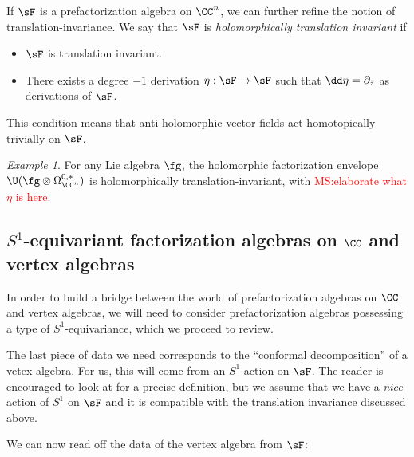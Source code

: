 \documentclass[12pt]{amsart}
\theoremstyle{definition}
\theoremstyle{remark}
\newtheorem{eg}[theorem]{Example}
\def\matt{\textcolor{red}{MS:}\textcolor{red}}
\begin{document}
If $\sF$ is a
prefactorization algebra on $\CC^n$, we can further refine the notion of translation-invariance. 
We say that $\sF$ is {\it holomorphically translation invariant}
if
\begin{itemize}
\item $\sF$ is translation invariant. 
\item There exists a degree $-1$ derivation $\eta: \sF \to
  \sF$ such that $\dd \eta = \partial_{\Bar{z}}$ as derivations of
  $\sF$. 
\end{itemize}

This condition means that anti-holomorphic vector fields act homotopically trivially on $\sF$. 

\begin{eg}
For any Lie algebra $\fg$, the holomorphic factorization envelope $\U(\fg \otimes \Omega^{0,*}_{\CC^n})$ is holomorphically translation-invariant, with \matt{elaborate what $\eta$ is here}.
\end{eg}


\subsection{$S^1$-equivariant factorization algebras on $\CC$ and vertex algebras}

In order to build a bridge between the world of prefactorization algebras on $\CC$ and vertex algebras, we will need to consider prefactorization algebras possessing a type of $S^1$-equivariance, which we proceed to review. 

The last piece of data we need corresponds to the ``conformal
decomposition'' of a vetex algebra. For us, this will come from an
$S^1$-action on $\sF$. The reader is encouraged to look at
\cite{CG} for a precise definition, but we assume that we have a {\it
  nice} action of $S^1$ on $\sF$ and it is compatible with the
translation invariance discussed above. 

We can now read off the data of the
vertex algebra from $\sF$:
\end{document}
